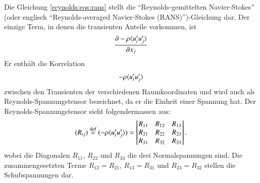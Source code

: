 %
Die Gleichung \eqref{reynolds:eqs:rans} stellt die
``Reynolds-gemittelten Navier-Stokes'' (oder englisch ``Reynolds-averaged
Navier-Stokes (RANS)'')-Gleichung dar. Der einzige Term, in denen die transienten
Anteile vorkommen, ist
%
$$\frac{\partial - \rho \ravg{u_i' u_j'}}{\partial x_j}$$
%
Er enthält die Korrelation
%
$$- \rho \ravg{u_i' u_j'}$$
%
zwischen den Transienten der verschiedenen Raumkoordinaten und wird auch als Reynolds-Spannungstensor
bezeichnet, da er die Einheit einer Spannung hat. Der Reynolds-Spannungstensor sieht folgendermassen aus:
%
\begin{equation}
    (R_{ij}) \overset{\text{def}}{=} (-\rho\ravg{u'_i u'_j}) =
        \begin{bmatrix}
            R_{11} & R_{12} & R_{13} \\
            R_{21} & R_{22} & R_{23} \\
            R_{31} & R_{32} & R_{33}
        \end{bmatrix}.
\end{equation}
%
wobei die Diagonalen $R_{11}$, $R_{22}$ und $R_{33}$ die drei Normalspannungen sind.
Die zusammengesetzten Terme $R_{12} = R_{21}$, $R_{13} = R_{31}$ und $R_{23} = R_{32}$ stellen
die Schubspannungen dar.
%
